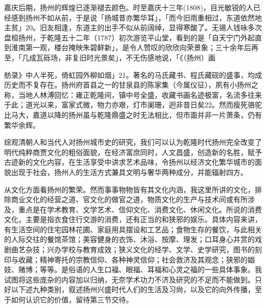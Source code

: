 嘉庆后期，扬州的辉煌已逐渐褪去颜色。时至嘉庆十三年(1808)，目光敏锐的人已经感到扬州不如从前，于是说「扬城昔亦繁华耳」，「而今旧雨重相过，东道依然地主贫」20。旧友相逢，东道主的出手不似从前阔绰，显得寒酸了。无锡人钱咏多次盘桓扬州，于乾隆五十二年（1787）初次游览平山堂，看到的是「自天宁门外起直到淮南第一观，楼台掩映朱碧鲜新」，是令人赞叹的欣欣向荣景象；三十余年后再至，「几成瓦砾场，非复旧时光景矣」，不无伤感地说，「《（扬州）画

\vfill
\begin{BookNotes}
\end{BookNotes}

\noindent 舫录》中人半死，倚虹园外柳如烟」21。著名的马氏藏书、程氏藏砚的盛事，均成历史而不复存在。扬州府首县之一的甘泉县的陈家集（今属仪征），夙有小扬州之称，当地人林溥回忆：雍正乾隆间，镇中号全盛，收藏书画名迹极富，名流多往来于此；道光以来，富家式微，物力亦艰，灯市阑珊，迥非昔日矣22。然而瘦死骆驼比马大，嘉道以降的扬州虽与乾隆鼎盛之时无法相比，但市面并非一片萧条，仍有繁华余辉。

综观清朝人和当代人对扬州城市史的研究，我们可以认为乾隆时代扬州完全改变了明代纯粹商贾文化的粗俗面貌，在经济富庶同时，人文昌盛，创造新的名胜，赋予古迹新的文化内容，在生活享受中讲求艺术品味，令扬州以经济文化繁华城市的面貌出现于社会，扬州人的生活方式兼具文明与奢华两种成分，并能辐射四方。


从文化方面看扬州的繁荣。然而事事物物皆有其文化内涵，我这里所讲的文化，排除商业文化的经营之道、官文化的做官之道，物质文化的生产与技术间或有所涉及，重点是在学术教育、文学艺术、信仰文化、消费文化、休闲文化。所说的消费文化，主要是指衣食住行交游的消费，还有正当的和狭邪的娱乐。具体内容来讲，有生活空间的住宅园林花圃、家庭用具摆设和工艺品；食物生存的餐饮，与此相关的人际交往的餐馆茶馆；美容健身的衣饰、沐浴、按摩、理发；口耳身心并赏的戏剧曲艺杂技；兴办学校与教育成效；狭义文化的经学、文学、史学研究，图书的刻印与收藏；精神寄托的宗教信仰、各种神灵信仰；社会救济及其观念；狭邪的娼妓、赌博；等等。是俗语的人生口福、眼福、耳福和心灵之福的一些具体事象。我试图将这些庞杂的内容加以归纳，无奈学术功力不济及研究的不足而不能做到。只好以下述九种类别，叙述扬州兴盛时代人们的生活及习尙，以及它的向外传播，至于如何认识它的价值，留待第三节交待。


